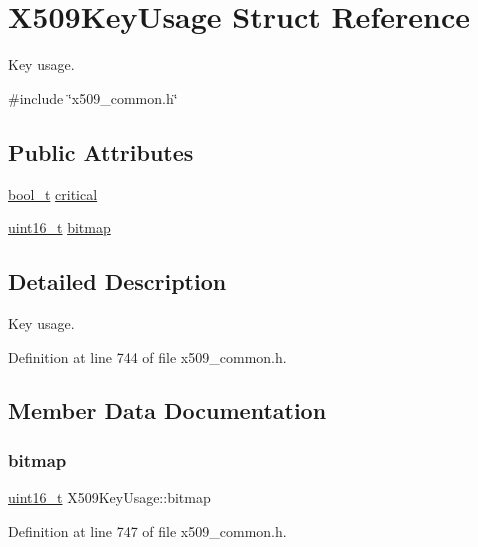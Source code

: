 \hypertarget{structX509KeyUsage}{}\section{X509\+Key\+Usage Struct Reference}
\label{structX509KeyUsage}


Key usage.  




{\ttfamily \#include \char`\"{}x509\+\_\+common.\+h\char`\"{}}

\subsection*{Public Attributes}
\begin{DoxyCompactItemize}
\item 
\hyperlink{compiler__port_8h_a812d16e5494522586b3784e55d479912}{bool\+\_\+t} \hyperlink{structX509KeyUsage_a111fd22c20e3dd57cbc8036432987a57}{critical}
\item 
\hyperlink{stdint_8h_a273cf69d639a59973b6019625df33e30}{uint16\+\_\+t} \hyperlink{structX509KeyUsage_a36e70866e15b4d2bac5c87bd3f985988}{bitmap}
\end{DoxyCompactItemize}


\subsection{Detailed Description}
Key usage. 

Definition at line 744 of file x509\+\_\+common.\+h.



\subsection{Member Data Documentation}
\mbox{\label{structX509KeyUsage_a36e70866e15b4d2bac5c87bd3f985988}} 
\subsubsection{\texorpdfstring{bitmap}{bitmap}}
{\footnotesize\ttfamily \hyperlink{stdint_8h_a273cf69d639a59973b6019625df33e30}{uint16\+\_\+t} X509\+Key\+Usage\+::bitmap}



Definition at line 747 of file x509\+\_\+common.\+h.

